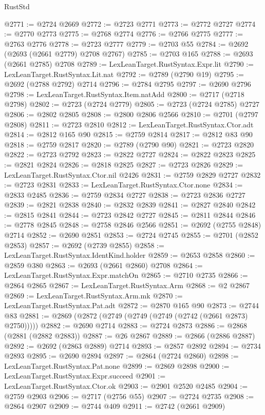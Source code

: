 \begin{lexlean}{RustStd}
\begin{coremodule}
@2771 := @2724 @2669
@2772 := @2723 @2771
@2773 := @2772 @2727
@2774 := @2770 @2773
@2775 := @2768 @2774
@2776 := @2766 @2775
@2777 := @2763 @2776
@2778 := @2723 @2777
@2779 := @2703 @55
@2784 := @2692 (@2693 (@2661 @2779) @2708 @2767)
@2785 := @2703 @165
@2788 := @2693 (@2661 @2785) @2708
@2789 := LexLeanTarget.RustSyntax.Expr.lit
@2790 := LexLeanTarget.RustSyntax.Lit.nat
@2792 := @2789 (@2790 @19)
@2795 := @2692 (@2788 @2792) @2714
@2796 := @2784 @2795
@2797 := @2690 @2796
@2798 := LexLeanTarget.RustSyntax.Item.natAdd
@2800 := @2717 (@2718 @2798)
@2802 := @2723 (@2724 @2779)
@2805 := @2723 (@2724 @2785) @2727
@2806 := @2802 @2805
@2808 := @2800 @2806 @2566
@2810 := @2701 (@2797 @2808)
@2811 := @2723 @2810
@2812 := LexLeanTarget.RustSyntax.Ctor.adt
@2814 := @2812 @165 @90
@2815 := @2759 @2814
@2817 := @2812 @83 @90
@2818 := @2759 @2817
@2820 := @2789 (@2790 @90)
@2821 := @2723 @2820
@2822 := @2723 @2792
@2823 := @2822 @2727
@2824 := @2822 @2823
@2825 := @2821 @2824
@2826 := @2818 @2825
@2827 := @2723 @2826
@2829 := LexLeanTarget.RustSyntax.Ctor.nil @2426
@2831 := @2759 @2829 @2727
@2832 := @2723 @2831
@2833 := LexLeanTarget.RustSyntax.Ctor.none
@2834 := @2833 @2485
@2836 := @2759 @2834 @2727
@2838 := @2723 @2836 @2727
@2839 := @2821 @2838
@2840 := @2832 @2839
@2841 := @2827 @2840
@2842 := @2815 @2841
@2844 := @2723 @2842 @2727
@2845 := @2811 @2844
@2846 := @2778 @2845
@2848 := @2758 @2846 @2566
@2851 := @2692 (@2755 @2848) @2714
@2852 := @2690 @2851
@2853 := @2724 @2745
@2855 := @2701 (@2852 @2853)
@2857 := @2692 (@2739 @2855)
@2858 := LexLeanTarget.RustSyntax.IdentKind.holder
@2859 := @2653 @2858
@2860 := @2859 @380
@2863 := @2693 (@2661 @2860) @2708
@2864 := LexLeanTarget.RustSyntax.Expr.matchOn
@2865 := @2710 @2735
@2866 := @2864 @2865
@2867 := LexLeanTarget.RustSyntax.Arm
@2868 := @2 @2867
@2869 := LexLeanTarget.RustSyntax.Arm.mk
@2870 := LexLeanTarget.RustSyntax.Pat.adt
@2872 := @2870 @165 @90
@2873 := @2744 @83
@2881 := @2869 (@2872 (@2749 (@2749 (@2749 (@2742 (@2661 @2873) @2750)))))
@2882 := @2690 @2714
@2883 := @2724 @2873
@2886 := @2868 (@2881 (@2882 @2883))
@2887 := @26 @2867
@2889 := @2866 (@2886 @2887)
@2892 := @2692 (@2863 @2889) @2714
@2893 := @2857 @2892
@2894 := @2734 @2893
@2895 := @2690 @2894
@2897 := @2864 (@2724 @2860)
@2898 := LexLeanTarget.RustSyntax.Pat.none
@2899 := @2869 @2898
@2900 := LexLeanTarget.RustSyntax.Expr.succeed
@2901 := LexLeanTarget.RustSyntax.Ctor.ok
@2903 := @2901 @2520 @2485
@2904 := @2759 @2903
@2906 := @2717 (@2756 @55)
@2907 := @2724 @2735
@2908 := @2864 @2907
@2909 := @2744 @409
@2911 := @2742 (@2661 @2909)

\end{coremodule}
\end{lexlean}
